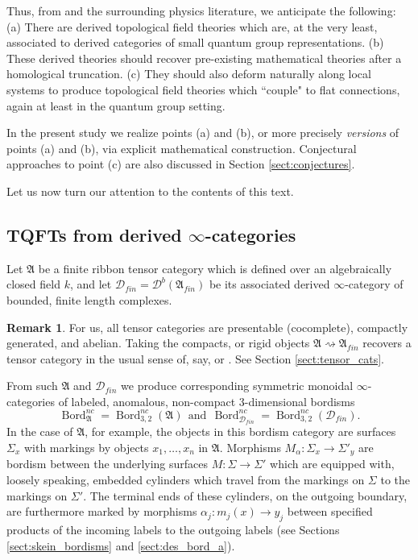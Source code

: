 \documentclass[reqno]{amsart}
\theoremstyle{definition}
\newtheorem{remark}[lemma]{Remark}
\newcommand{\mfk}[1]{\mathfrak{#1}}
\newcommand{\msc}[1]{\mathscr{#1}}
\DeclareMathOperator{\Bord}{Bord}
\renewcommand{\1}{\mathbf{1}}
\begin{document}
Thus, from \cite{creutzigetal24} and the surrounding physics literature, we anticipate the following: (a) There are derived topological field theories which are, at the very least, associated to derived categories of small quantum group representations. (b) These derived theories should recover pre-existing mathematical theories after a homological truncation. (c) They should also deform naturally along local systems to produce topological field theories which ``couple" to flat connections, again at least in the quantum group setting.
\par

In the present study we realize points (a) and (b), or more precisely \emph{versions} of points (a) and (b), via explicit mathematical construction. Conjectural approaches to point (c) are also discussed in Section \ref{sect:conjectures}.
\par

Let us now turn our attention to the contents of this text.

\subsection{TQFTs from derived $\infty$-categories}
\label{sect:derived_intro}

Let $\mfk{A}$ be a finite ribbon tensor category which is defined over an algebraically closed field $k$, and let $\msc{D}_{fin}=\msc{D}^b(\mfk{A}_{fin})$ be its associated derived $\infty$-category of bounded, finite length complexes.

\begin{remark}
For us, all tensor categories are presentable (cocomplete), compactly generated, and abelian. Taking the compacts, or rigid objects $\mfk{A}\rightsquigarrow \mfk{A}_{fin}$ recovers a tensor category in the usual sense of, say, \cite{bakalovkirillov01} or \cite{egno15}.  See Section \ref{sect:tensor_cats}.
\end{remark}

From such $\mfk{A}$ and $\msc{D}_{fin}$ we produce corresponding symmetric monoidal $\infty$-categories of labeled, anomalous, non-compact $3$-dimensional bordisms
\[
\Bord^{nc}_{\mfk{A}}=\Bord_{3,2}^{nc}(\mfk{A})\ \ \text{and}\ \ \Bord^{nc}_{\msc{D}_{fin}}=\Bord^{nc}_{3,2}(\msc{D}_{fin}).
\]
In the case of $\mfk{A}$, for example, the objects in this bordism category are surfaces $\Sigma_x$ with markings by objects $x_1,\dots,x_n$ in $\mfk{A}$. Morphisms $M_{\alpha}:\Sigma_x\to \Sigma'_y$ are bordism between the underlying surfaces $M:\Sigma\to \Sigma'$ which are equipped with, loosely speaking, embedded cylinders which travel from the markings on $\Sigma$ to the markings on $\Sigma'$. The terminal ends of these cylinders, on the outgoing boundary, are furthermore marked by morphisms $\alpha_j:m_j(x)\to y_j$ between specified products of the incoming labels to the outgoing labels (see Sections \ref{sect:skein_bordisms} and \ref{sect:des_bord_a}).
\par
\end{document}
